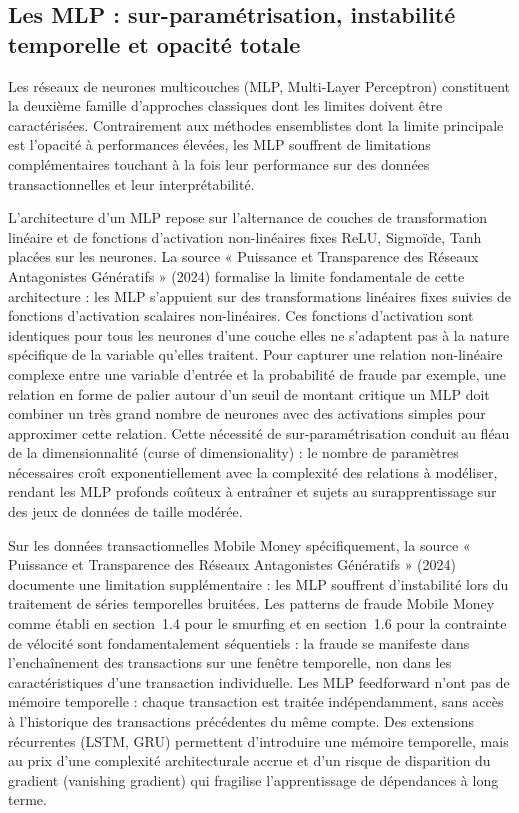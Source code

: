 \documentclass[11pt,a4paper,oneside]{report}
\theoremstyle{definition}
\theoremstyle{remark}
\begin{document}
\subsection{Les MLP : sur-paramétrisation, instabilité temporelle et opacité totale}

Les réseaux de neurones multicouches (MLP, Multi-Layer Perceptron) constituent la deuxième famille d'approches classiques dont les limites doivent être caractérisées. Contrairement aux méthodes ensemblistes dont la limite principale est l'opacité à performances élevées, les MLP souffrent de limitations complémentaires touchant à la fois leur performance sur des données transactionnelles et leur interprétabilité.

L'architecture d'un MLP repose sur l'alternance de couches de transformation linéaire et de fonctions d'activation non-linéaires fixes  ReLU, Sigmoïde, Tanh  placées sur les neurones. La source « Puissance et Transparence des Réseaux Antagonistes Génératifs » (2024) formalise la limite fondamentale de cette architecture : les MLP s'appuient sur des transformations linéaires fixes suivies de fonctions d'activation scalaires non-linéaires. Ces fonctions d'activation sont identiques pour tous les neurones d'une couche  elles ne s'adaptent pas à la nature spécifique de la variable qu'elles traitent. Pour capturer une relation non-linéaire complexe entre une variable d'entrée et la probabilité de fraude  par exemple, une relation en forme de palier autour d'un seuil de montant critique  un MLP doit combiner un très grand nombre de neurones avec des activations simples pour approximer cette relation. Cette nécessité de sur-paramétrisation conduit au fléau de la dimensionnalité (curse of dimensionality) : le nombre de paramètres nécessaires croît exponentiellement avec la complexité des relations à modéliser, rendant les MLP profonds coûteux à entraîner et sujets au surapprentissage sur des jeux de données de taille modérée.

Sur les données transactionnelles Mobile Money spécifiquement, la source « Puissance et Transparence des Réseaux Antagonistes Génératifs » (2024) documente une limitation supplémentaire : les MLP souffrent d'instabilité lors du traitement de séries temporelles bruitées. Les patterns de fraude Mobile Money  comme établi en section~1.4 pour le smurfing et en section~1.6 pour la contrainte de vélocité  sont fondamentalement séquentiels : la fraude se manifeste dans l'enchaînement des transactions sur une fenêtre temporelle, non dans les caractéristiques d'une transaction individuelle. Les MLP feedforward n'ont pas de mémoire temporelle : chaque transaction est traitée indépendamment, sans accès à l'historique des transactions précédentes du même compte. Des extensions récurrentes (LSTM, GRU) permettent d'introduire une mémoire temporelle, mais au prix d'une complexité architecturale accrue et d'un risque de disparition du gradient (vanishing gradient) qui fragilise l'apprentissage de dépendances à long terme.
\end{document}

